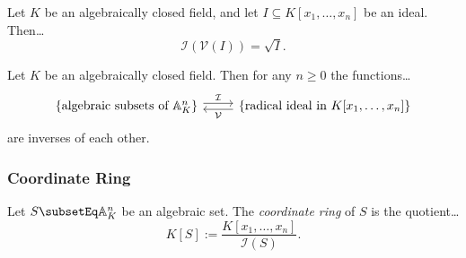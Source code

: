 \begin{proposition}
Let $K$ be an algebraically closed field, and let $I \subseteq K[x_1,\dots,x_n]$ be an ideal. Then\dots
$$\mathcal{I}(\mathcal{V}(I)) = \sqrt{I}.$$
\end{proposition}

\begin{corollary}
Let $K$ be an algebraically closed field. Then for any $n \geq 0$ the functions\dots
\[
    \begin{tikzcd}[every arrow/.append style={shift left}]
        \{ \textrm{algebraic subsets of } \mathbb{A}^n_K \} \arrow{r}{\mathcal{I}} &\{ \textrm{radical ideal in } K[x_1, \dots, x_n] \} \arrow{l}{\mathcal{V}}
    \end{tikzcd}
\]
are inverses of each other.
\end{corollary}

\subsubsection{Coordinate Ring}
Let $S \subsetEq \mathbb{A}^n_K$ be an algebraic set. The \emph{coordinate ring} of $S$ is the quotient\dots
$$K[S] := \frac{K[x_1,\dots,x_n]}{\mathcal{I}(S)}.$$